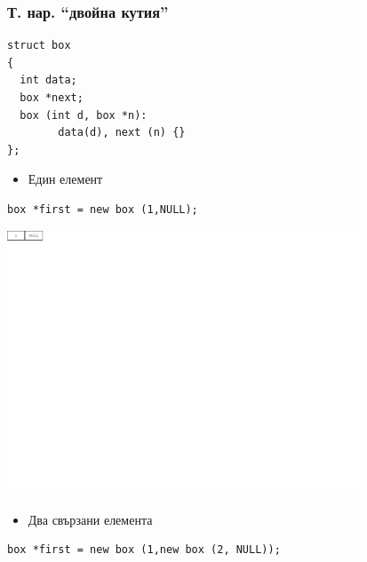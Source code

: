 \documentclass{beamer}
\begin{document}
\begin{frame}[fragile]
\frametitle{Т. нар. ``двойна кутия''}

\begin{flushleft}
\begin{lstlisting}
struct box
{
  int data;
  box *next;
  box (int d, box *n):
        data(d), next (n) {}
};
\end{lstlisting}  
\end{flushleft}

\begin{itemize}
  \item  Един елемент
\end{itemize}

\begin{flushleft}
\begin{lstlisting}
box *first = new box (1,NULL);
\end{lstlisting}  
\end{flushleft}

\includegraphics[width=10.5cm]{images/01_llbox_onebox.pdf}

\vspace{-210px}

\begin{itemize}
  \item  Два свързани елемента
\end{itemize}

\begin{flushleft}
\begin{lstlisting}
box *first = new box (1,new box (2, NULL));
\end{lstlisting}  
\end{flushleft}


\end{frame}
\end{document}
